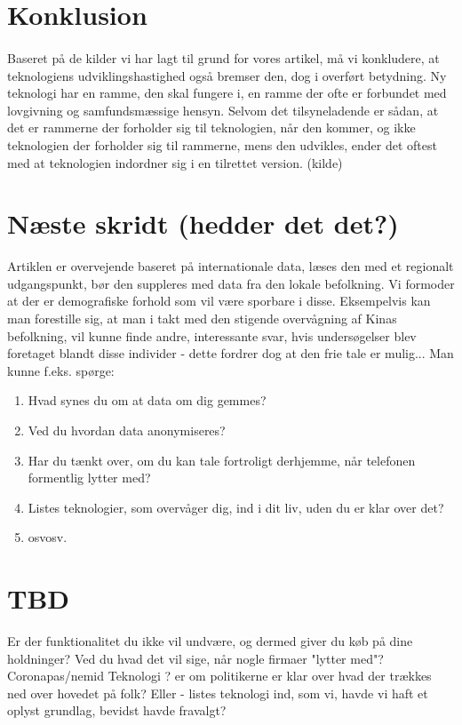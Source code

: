 \documentclass{article}
\begin{document}
\section{Konklusion}
\paragraph{}
Baseret på de kilder vi har lagt til grund for vores artikel, må vi konkludere, at teknologiens udviklingshastighed også bremser den, dog i overført betydning. Ny teknologi har en ramme, den skal fungere i, en ramme der ofte er forbundet med lovgivning og samfundsmæssige hensyn. Selvom det tilsyneladende er sådan, at det er rammerne der forholder sig til teknologien, når den kommer, og ikke teknologien der forholder sig til rammerne, mens den udvikles, ender det oftest med at teknologien indordner sig i en tilrettet version.  (kilde)

\section{Næste skridt (hedder det det?)}
Artiklen er overvejende baseret på internationale data, læses den med et regionalt udgangspunkt, bør den suppleres med data fra den lokale befolkning. Vi formoder at der er demografiske forhold som vil være sporbare i disse. Eksempelvis kan man forestille sig, at man i takt med den stigende overvågning af Kinas befolkning, vil kunne finde andre, interessante svar, hvis undersøgelser blev foretaget blandt disse individer - dette fordrer dog at den frie tale er mulig... 
Man kunne f.eks. spørge:
\begin{enumerate}
    \item Hvad synes du om at data om dig gemmes?
    \item Ved du hvordan data anonymiseres?
    \item Har du tænkt over, om du kan tale fortroligt derhjemme, når telefonen formentlig lytter med?
    \item Listes teknologier, som overvåger dig, ind i dit liv, uden du er klar over det?
    \item osvosv.    
\end{enumerate}
\newpage
\section{TBD}
Er der funktionalitet du ikke vil undvære, og dermed giver du køb på dine holdninger?
Ved du hvad det vil sige, når nogle firmaer "lytter med"?
Coronapas/nemid
Teknologi
? er om politikerne er klar over hvad der trækkes ned over hovedet på folk?
Eller - listes teknologi ind, som vi, havde vi haft et oplyst grundlag, bevidst havde fravalgt?
\end{document}
